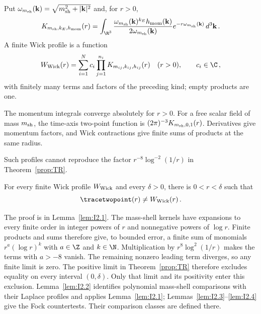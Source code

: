 \begin{definition}\label{def:D17}
Put $\omega_{m_{\rm sh}}(\mathbf k)=\sqrt{m_{\rm sh}^2+|\mathbf k|^2}$ and, for $r>0$,
\begin{equation*}
K_{m_{\rm sh},k_E,h_{\rm mom}}(r)=\int_{\R^3}\frac{\omega_{m_{\rm sh}}(\mathbf k)^{k_E}h_{\rm mom}(\mathbf k)}{2\omega_{m_{\rm sh}}(\mathbf k)}e^{-r\omega_{m_{\rm sh}}(\mathbf k)}\,d^3\mathbf k\,.
\end{equation*}
A finite Wick profile is a function
\begin{equation*}
W_{\rm Wick}(r)=\sum_{i=1}^{N}c_i\prod_{j=1}^{n_i}K_{m_{ij},k_{ij},h_{ij}}(r)\quad(r>0),\qquad c_i\in\C\,,
\end{equation*}
with finitely many terms and factors of the preceding kind; empty products are one.
\end{definition}

The momentum integrals converge absolutely for $r>0$. For a free scalar field of mass $m_{\rm sh}$, the time-axis two-point function is $(2\pi)^{-3}K_{m_{\rm sh},0,1}(r)$. Derivatives give momentum factors, and Wick contractions give finite sums of products at the same radius.

Such profiles cannot reproduce the factor $r^{-8}\log^{-2}(1/r)$ in Theorem~\ref{prop:TR}.

\begin{proposition}\label{prop:NF}
For every finite Wick profile $W_{\rm Wick}$ and every $\delta>0$, there is $0<r<\delta$ such that
\begin{equation*}
\tracetwopoint(r)\ne W_{\rm Wick}(r)\,.
\end{equation*}
\end{proposition}

The proof is in Lemma~\ref{lem:I2.1}. The mass-shell kernels have expansions to every finite order in integer powers of $r$ and nonnegative powers of $\log r$. Finite products and sums therefore give, to bounded error, a finite sum of monomials $r^a(\log r)^k$ with $a\in\Z$ and $k\in\N$. Multiplication by $r^8\log^2(1/r)$ makes the terms with $a>-8$ vanish. The remaining nonzero leading term diverges, so any finite limit is zero. The positive limit in Theorem~\ref{prop:TR} therefore excludes equality on every interval $(0,\delta)$. Only that limit and its positivity enter this exclusion. Lemma~\ref{lem:I2.2} identifies polynomial mass-shell comparisons with their Laplace profiles and applies Lemma~\ref{lem:I2.1}; Lemmas~\ref{lem:I2.3}--\ref{lem:I2.4} give the Fock countertests. Their comparison classes are defined there.

